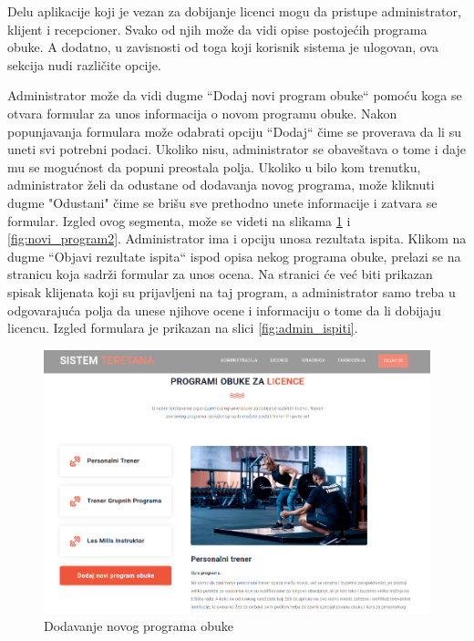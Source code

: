 Delu aplikacije koji je vezan za dobijanje licenci mogu da pristupe administrator, klijent i recepcioner. Svako od njih može da vidi opise postojećih programa obuke. A dodatno, u zavisnosti od toga koji korisnik sistema je ulogovan, ova sekcija nudi različite opcije.

Administrator može da vidi dugme ``Dodaj novi program obuke`` pomoću koga se otvara formular za unos informacija o novom programu obuke. Nakon popunjavanja formulara može odabrati opciju ``Dodaj`` čime se proverava da li su uneti svi potrebni podaci. Ukoliko nisu, administrator se obaveštava o tome i daje mu se mogućnost da popuni preostala polja. Ukoliko u bilo kom trenutku, administrator želi da odustane od dodavanja novog programa, može kliknuti dugme "Odustani" čime se brišu sve prethodno unete informacije i zatvara se formular. Izgled ovog segmenta, može se videti na slikama \ref{fig:novi_program1} i \ref{fig:novi_program2}.
Administrator ima i opciju unosa rezultata ispita. Klikom na dugme ``Objavi rezultate ispita`` ispod opisa nekog programa obuke, prelazi se na stranicu koja sadrži formular za unos ocena. Na stranici će već biti prikazan spisak klijenata koji su prijavljeni na taj program, a administrator samo treba u odgovarajuća polja da unese njihove ocene i informaciju o tome da li dobijaju licencu. Izgled formulara je prikazan na slici \ref{fig:admin_ispiti}.

\begin{figure}[!ht]
\begin{center}
\includegraphics[scale=0.30]{sections/korisnicki_interfejs/screenshots/licenca-admin.png}
\end{center}
\caption{Dodavanje novog programa obuke}
\label{fig:novi_program1}
\end{figure}

